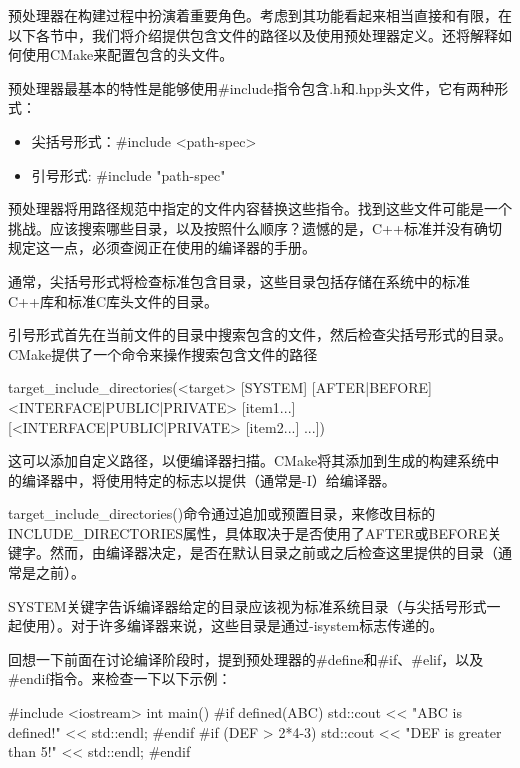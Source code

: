 
预处理器在构建过程中扮演着重要角色。考虑到其功能看起来相当直接和有限，在以下各节中，我们将介绍提供包含文件的路径以及使用预处理器定义。还将解释如何使用CMake来配置包含的头文件。


预处理器最基本的特性是能够使用\#include指令包含.h和.hpp头文件，它有两种形式：

\begin{itemize}
\item
尖括号形式：\#include <path-spec>

\item
引号形式: \#include "path-spec"
\end{itemize}

预处理器将用路径规范中指定的文件内容替换这些指令。找到这些文件可能是一个挑战。应该搜索哪些目录，以及按照什么顺序？遗憾的是，C++标准并没有确切规定这一点，必须查阅正在使用的编译器的手册。

通常，尖括号形式将检查标准包含目录，这些目录包括存储在系统中的标准C++库和标准C库头文件的目录。

引号形式首先在当前文件的目录中搜索包含的文件，然后检查尖括号形式的目录。
CMake提供了一个命令来操作搜索包含文件的路径

\begin{shell}
target_include_directories(<target> [SYSTEM] [AFTER|BEFORE]
                           <INTERFACE|PUBLIC|PRIVATE> [item1...]
                          [<INTERFACE|PUBLIC|PRIVATE> [item2...]
...])
\end{shell}

这可以添加自定义路径，以便编译器扫描。CMake将其添加到生成的构建系统中的编译器中，将使用特定的标志以提供（通常是-I）给编译器。

target\_include\_directories()命令通过追加或预置目录，来修改目标的INCLUDE\_DIRECTORIES属性，具体取决于是否使用了AFTER或BEFORE关键字。然而，由编译器决定，是否在默认目录之前或之后检查这里提供的目录（通常是之前）。

SYSTEM关键字告诉编译器给定的目录应该视为标准系统目录（与尖括号形式一起使用）。对于许多编译器来说，这些目录是通过-isystem标志传递的。


回想一下前面在讨论编译阶段时，提到预处理器的\#define和\#if、\#elif，以及\#endif指令。来检查一下以下示例：


\begin{cpp}
#include <iostream>
int main() {
#if defined(ABC)
    std::cout << "ABC is defined!" << std::endl;
#endif
#if (DEF > 2*4-3)
    std::cout << "DEF is greater than 5!" << std::endl;
#endif
}
\end{cpp}

